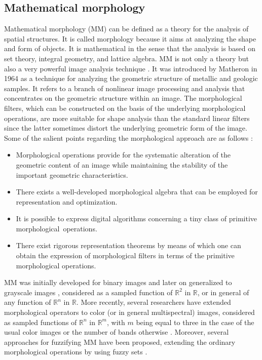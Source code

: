 \documentclass[final,a4paper,12pt,english]{UnicaPhdThesis3}
\begin{document}
\subsection{Mathematical morphology} %
Mathematical morphology (MM) can be defined as a theory for the analysis of spatial structures. It is called morphology because it aims at analyzing the shape and form of objects. It is mathematical in the sense that the analysis is based on set theory, integral geometry, and lattice algebra. MM is not only a theory but also a very powerful image analysis technique \cite{Soille2004}.
It was introduced by Matheron in 1964 as a technique for analyzing the geometric structure of metallic and geologic samples. It refers to a branch of nonlinear image processing and analysis that concentrates on the geometric structure within an image.
The morphological filters, which can be constructed on the basis of the underlying morphological operations, are more suitable for shape analysis than the standard linear filters since the latter sometimes distort the underlying geometric form of the image. Some of the salient points regarding the morphological approach are as follows \cite{Giardina1988}:
\begin{itemize}
	\item Morphological operations provide for the systematic alteration of the geometric content of an image while maintaining the stability of the important geometric characteristics.
	\item There exists a well-developed morphological algebra that can be employed for representation and optimization.
	\item It is possible to express digital algorithms concerning a tiny class of primitive morphological~operations.
	\item There exist rigorous representation theorems by means of which one can obtain the expression of morphological filters in terms of the primitive morphological operations.
\end{itemize}

MM was initially developed for binary images and later on generalized to grayscale images \cite{Soille2004, Serra1984}, considered as a sampled function of $\mathbb{R}^{2}$ in $\mathbb{R}$, or in general of any function of $\mathbb{R}^{n}$ in $\mathbb{R}$.
More recently, several researchers have extended morphological operators to color (or in general multispectral) images, considered as sampled functions of $\mathbb{R}^{n}$ in $\mathbb{R}^{m}$, with $m$ being equal to three in the case of the usual color images or the number of bands otherwise \cite{Benavent2012}.  Moreover, several approaches for fuzzifying MM have been proposed, extending the ordinary morphological operations by using fuzzy sets \cite{Kerre2000}.
\end{document}
